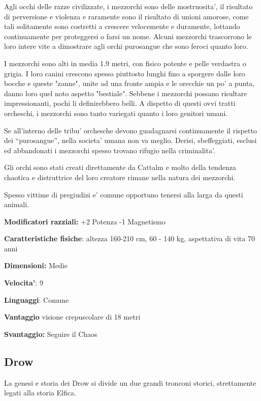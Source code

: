 \documentclass[a4paper,11pt,twoside,openany]{dndbook}
\begin{document}
\label{mezzorco}

Agli occhi delle razze civilizzate, i mezzorchi sono delle mostruosita', il risultato di perversione e violenza e raramente sono il risultato di unioni amorose, come tali solitamente sono costretti a crescere velocemente e duramente, lottando continuamente per proteggersi o farsi un nome. Alcuni mezzorchi trascorrono le loro intere vite a dimostrare agli orchi purosangue che sono feroci quanto loro.

I mezzorchi sono alti in media 1.9 metri, con fisico potente e pelle verdastra o grigia. I loro canini crescono spesso piuttosto lunghi fino a sporgere dalle loro bocche e queste "zanne", unite ad una fronte ampia e le orecchie un po' a punta, danno loro quel noto aspetto "bestiale". Sebbene i mezzorchi possano risultare impressionanti, pochi li definirebbero belli. A dispetto di questi ovvi tratti orcheschi, i mezzorchi sono tanto variegati quanto i loro genitori umani.

Se all'interno delle tribu' orchesche devono guadagnarsi continuamente il rispetto dei ``purosangue'', nella societa' umana non va meglio. Derisi, sbeffeggiati, esclusi ed abbandonati i mezzorchi spesso trovano rifugio nella criminalita'.

Gli orchi sono stati creati direttamente da Cattalm e molto della tendenza chaotica e distruttrice del loro creatore rimane nella natura dei mezzorchi.

Spesso vittime di pregiudizi e' comune opportuno tenersi alla larga da questi animali.

\textbf{Modificatori razziali:} +2 Potenza -1 Magnetismo

\textbf{Caratteristiche fisiche}: altezza 160-210 cm, 60 - 140 kg,
aspettativa di vita 70 anni

\textbf{Dimensioni:} Medie

\textbf{Velocita'}: 9

\textbf{Linguaggi}: Comune

\textbf{Vantaggio} visione crepuscolare di 18 metri

\textbf{Svantaggio:} Seguire il Chaos

\subsection{Drow}

\label{drow}

La genesi e storia dei Drow si divide un due grandi tronconi storici, strettamente legati alla storia Elfica.
\end{document}
